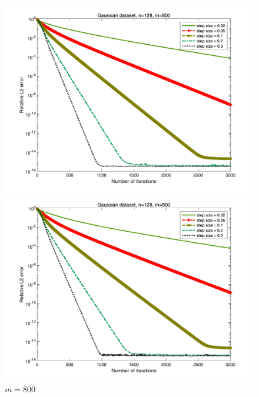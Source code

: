 \documentclass{article}
\begin{document}
	\begin{figure}
		\begin{minipage}{0.33\linewidth}
			\centering
			\includegraphics[width=1\linewidth]{./fig/gaussian+21.png}
			\caption{$m=400$}
		\end{minipage}
		\begin{minipage}{0.33\linewidth}
			\centering
			\includegraphics[width=1\linewidth]{./fig/gaussian+22.png}
			\caption{$m=800$}
		\end{minipage}
		\begin{minipage}{0.33\linewidth}
			\centering

\end{minipage}
\end{figure}
\end{document}

